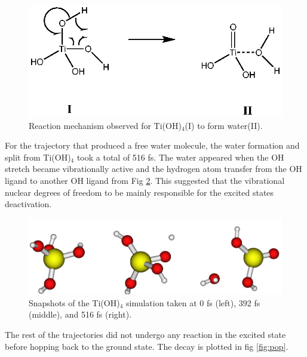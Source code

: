 \documentclass[11pt]{article}
\begin{document}
\begin{figure}[H]
  \centering
  \includegraphics[scale=0.6]{reaction.eps}
  \caption{Reaction mechanism observed for Ti(OH)$_4$(I) to form
water(II).}
  \label{fig:reaction}
\end{figure}

For the trajectory that produced a free water molecule, the water 
formation and split from
Ti(OH)$_4$ took a total of 516 fs. The water appeared when the OH stretch
became vibrationally active and the hydrogen atom transfer from the OH ligand
to another OH ligand from Fig \ref{fig:snaps}. This suggested that the
vibrational nuclear degrees of freedom to be mainly responsible for
the excited states deactivation.


\begin{figure}[H]
  \centering
  \includegraphics[scale=0.35]{tio2_snaps.png}
  \caption{Snapshots of the Ti(OH)$_4$ simulation taken at 0 fs (left),
    392 fs (middle), and 516 fs (right).}
  \label{fig:snaps}
\end{figure}

The rest of the trajectories did not undergo any reaction in the
excited state before hopping back to the ground state. The decay 
is plotted in fig \ref{fig:pop}.
\end{document}
